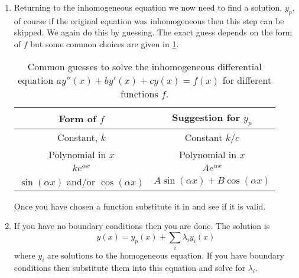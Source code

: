 \begin{enumerate}
    \item Returning to the inhomogeneous equation we now need to find a solution, \(y_p\), of course if the original equation was inhomogeneous then this step can be skipped.
    We again do this by guessing.
    The exact guess depends on the form of \(f\) but some common choices are given in \cref{tab:common guesses for differential equation}.
    \begin{table}
        \caption{Common guesses to solve the inhomogeneous differential equation \(ay''(x) + by'(x) + cy(x) = f(x)\) for different functions \(f\).}
        \label{tab:common guesses for differential equation}
        \begin{tabular}{cc}
            \toprule
            Form of \(f\) & Suggestion for \(y_p\)\\\midrule
            Constant, \(k\) & Constant \(k/c\)\\
            Polynomial in \(x\) & Polynomial in \(x\)\\
            \(ke^{\alpha x}\) & \(A e^{\alpha x}\)\\
            \(\sin(\alpha x)\) and/or \(\cos(\alpha x)\) & \(A\sin(\alpha x) + B\cos(\alpha x)\)\\\bottomrule
        \end{tabular}
    \end{table}
    Once you have chosen a function substitute it in and see if it is valid.
    
    \item If you have no boundary conditions then you are done.
    The solution is
    \begin{equation}
        y(x) = y_p(x) + \sum_i\lambda_i y_i(x)
    \end{equation}
    where \(y_i\) are solutions to the homogeneous equation.
    If you have boundary conditions then substitute them into this equation and solve for \(\lambda_i\).
\end{enumerate}

